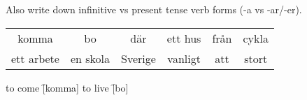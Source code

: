 \begin{flushleft}
    Also write down infinitive vs present tense verb forms (-a vs -ar/-er).
\end{flushleft}
\begin{center}
    \begin{tabular}{|c c c c c c|}
        \hline
        komma & bo & där & ett hus & från & cykla \\
        ett arbete & en skola & Sverige & vanligt & att & stort \\
        \hline
    \end{tabular}
\end{center}

\begin{questions}
    \begin{multicols}{2}
        \raggedcolumns
        \question to come \f[komma]
        \question to live \f[bo]
    \end{multicols}
\end{questions}